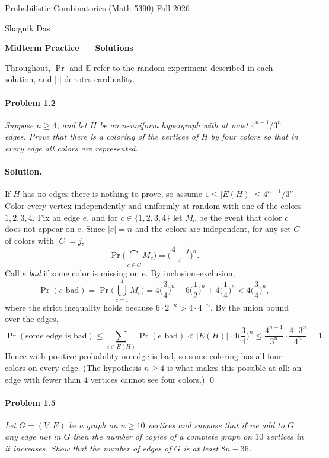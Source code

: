\documentclass[a4paper,12pt]{article}
\newcommand{\courseTitle}{Probabilistic Combinatorics (Math 5390)}
\newcommand{\semester}{Fall 2026}
\newcommand{\instructorA}{Shagnik Das}
\newcommand{\instructorB}{}
\newcommand{\buildtitle}[4]{
\begin{flushleft}
{\large
#1
\hfill{}
#2
\par
#3
}
\end{flushleft}
\vskip 4pt
\begin{center}
{\large\bfseries#4\par}
\end{center}
\bigskip
}
\newcommand{\card}[1]{\left| #1 \right|}
\newcommand{\mb}[1]{\mathbb{#1}}
\theoremstyle{definition}
\theoremstyle{plain}
\begin{document}
\buildtitle{\courseTitle{}}{\semester}{\instructorA{} \hfill \instructorB{}}{Midterm Practice --- Solutions}

Throughout, $\Pr$ and $\mb E$ refer to the random experiment described in each solution, and $\card{\cdot}$ denotes cardinality.

\paragraph{Problem 1.2} \emph{Suppose $n \ge 4$, and let $H$ be an $n$-uniform hypergraph with at most $4^{n-1}/3^n$ edges. Prove that there is a coloring of the vertices of $H$ by four colors so that in every edge all colors are represented.}

\paragraph{Solution.} If $H$ has no edges there is nothing to prove, so assume $1 \le \card{E(H)} \le 4^{n-1}/3^n$. Color every vertex independently and uniformly at random with one of the colors $1,2,3,4$. Fix an edge $e$, and for $c \in \{1,2,3,4\}$ let $M_c$ be the event that color $c$ does not appear on $e$. Since $\card e = n$ and the colors are independent, for any set $C$ of colors with $\card C = j$,
\[
	\Pr\Big( \bigcap_{c \in C} M_c \Big) = \Big( \frac{4-j}{4} \Big)^n .
\]
Call $e$ \emph{bad} if some color is missing on $e$. By inclusion--exclusion,
\[
	\Pr(e \text{ bad}) = \Pr\Big( \bigcup_{c=1}^4 M_c \Big) = 4 \Big(\frac34\Big)^n - 6 \Big(\frac12\Big)^n + 4 \Big(\frac14\Big)^n < 4 \Big(\frac34\Big)^n,
\]
where the strict inequality holds because $6 \cdot 2^{-n} > 4 \cdot 4^{-n}$. By the union bound over the edges,
\[
	\Pr(\text{some edge is bad}) \le \sum_{e \in E(H)} \Pr(e \text{ bad}) < \card{E(H)} \cdot 4 \Big(\frac34\Big)^n \le \frac{4^{n-1}}{3^n} \cdot \frac{4 \cdot 3^n}{4^n} = 1 .
\]
Hence with positive probability no edge is bad, so some coloring has all four colors on every edge. (The hypothesis $n \ge 4$ is what makes this possible at all: an edge with fewer than $4$ vertices cannot see four colors.) \qed

\paragraph{Problem 1.5} \emph{Let $G = (V,E)$ be a graph on $n \ge 10$ vertices and suppose that if we add to $G$ any edge not in $G$ then the number of copies of a complete graph on $10$ vertices in it increases. Show that the number of edges of $G$ is at least $8n - 36$.}
\end{document}
